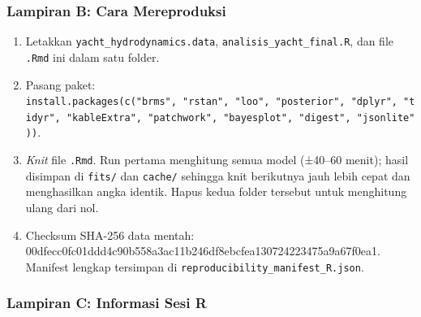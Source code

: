 \documentclass[
]{article}
\providecommand{\tightlist}{%
  \setlength{\itemsep}{0pt}\setlength{\parskip}{0pt}}
\begin{document}
\subsubsection{Lampiran B: Cara
Mereproduksi}\label{lampiran-b-cara-mereproduksi}

\begin{enumerate}
\def\labelenumi{\arabic{enumi}.}
\tightlist
\item
  Letakkan \texttt{yacht\_hydrodynamics.data},
  \texttt{analisis\_yacht\_final.R}, dan file \texttt{.Rmd} ini dalam
  satu folder.
\item
  Pasang paket:
  \texttt{install.packages(c("brms",\ "rstan",\ "loo",\ "posterior",\ "dplyr",\ "tidyr",\ "kableExtra",\ "patchwork",\ "bayesplot",\ "digest",\ "jsonlite"))}.
\item
  \emph{Knit} file \texttt{.Rmd}. Run pertama menghitung semua model
  (±40--60 menit); hasil disimpan di \texttt{fits/} dan \texttt{cache/}
  sehingga knit berikutnya jauh lebih cepat dan menghasilkan angka
  identik. Hapus kedua folder tersebut untuk menghitung ulang dari nol.
\item
  Checksum SHA-256 data mentah:
  00dfecc0fc01ddd4c90b558a3ac11b246df8ebcfea130724223475a9a67f0ea1.
  Manifest lengkap tersimpan di
  \texttt{reproducibility\_manifest\_R.json}.
\end{enumerate}

\subsubsection{Lampiran C: Informasi Sesi
R}\label{lampiran-c-informasi-sesi-r}
\end{document}
